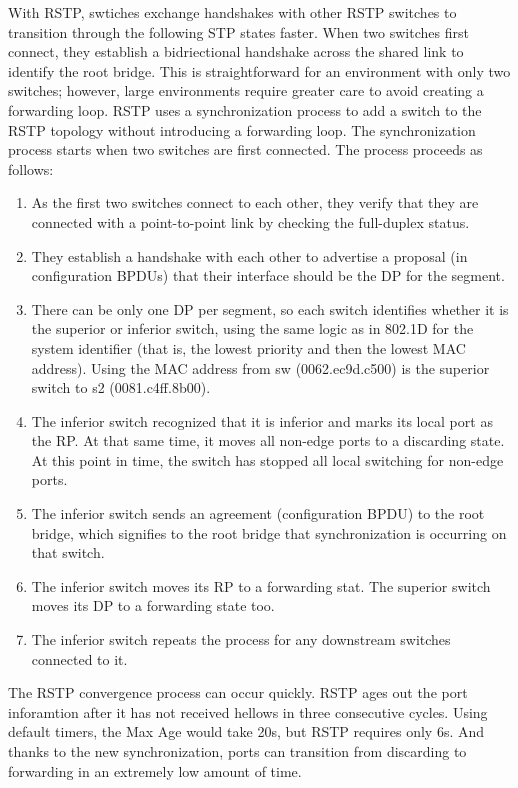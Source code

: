 \documentclass{article}
\begin{document}
	With RSTP, swtiches exchange handshakes with other RSTP switches to transition through the following STP states faster. When two switches first connect, they establish a bidriectional handshake across the shared link to identify the root bridge. This is straightforward for an environment with only two switches; however, large environments require greater care to avoid creating a forwarding loop. RSTP uses a synchronization process to add a switch to the RSTP topology without introducing a forwarding loop. The synchronization process starts when two switches are first connected. The process proceeds as follows:
\begin{enumerate}[label = \arabic*]
\item As the first two switches connect to each other, they verify that they are connected with a point-to-point link by checking the full-duplex status.
\item They establish a handshake with each other to advertise a proposal (in configuration BPDUs) that their interface should be the DP for the segment.
\item There can be only one DP per segment, so each switch identifies whether it is the superior or inferior switch, using the same logic as in 802.1D for the system identifier (that is, the lowest priority and then the lowest MAC address). Using the MAC address from sw (0062.ec9d.c500) is the superior switch to s2 (0081.c4ff.8b00).
\item The inferior switch recognized that it is inferior and marks its local port as the RP. At that same time, it moves all non-edge ports to a discarding state. At this point in time, the switch has stopped all local switching for non-edge ports.
\item The inferior switch sends an agreement (configuration BPDU) to the root bridge, which signifies to the root bridge that synchronization is occurring on that switch.
\item The inferior switch moves its RP to a forwarding stat. The superior switch moves its DP to a forwarding state too.
\item The inferior switch repeats the process for any downstream switches connected to it.
\end{enumerate}

	The RSTP convergence process can occur quickly. RSTP ages out the port inforamtion after it has not received hellows in three consecutive cycles. Using default timers, the Max Age would take 20s, but RSTP requires only 6s. And thanks to the new synchronization, ports can transition from discarding to forwarding in an extremely low amount of time. \\
\end{document}

